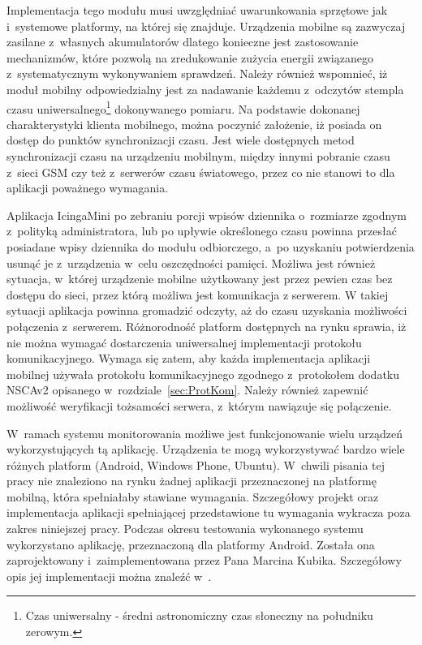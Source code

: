 Implementacja tego modułu musi uwzględniać uwarunkowania sprzętowe jak
i~systemowe platformy, na której się znajduje. Urządzenia mobilne są
zazwyczaj zasilane z~własnych akumulatorów dlatego konieczne jest
zastosowanie mechanizmów, które pozwolą na zredukowanie zużycia
energii związanego z~systematycznym wykonywaniem sprawdzeń. Należy
również wspomnieć, iż moduł mobilny odpowiedzialny jest za nadawanie
każdemu z~odczytów stempla czasu uniwersalnego\footnote{Czas
  uniwersalny - średni astronomiczny czas słoneczny na południku
  zerowym.} dokonywanego pomiaru. Na podstawie dokonanej
charakterystyki klienta mobilnego, można poczynić założenie, iż
posiada on dostęp do punktów synchronizacji czasu. Jest wiele
dostępnych metod synchronizacji czasu na urządzeniu mobilnym, między
innymi pobranie czasu z~sieci GSM czy też z~serwerów czasu światowego,
przez co nie stanowi to dla aplikacji poważnego wymagania.

Aplikacja IcingaMini po zebraniu porcji wpisów dziennika o~rozmiarze
zgodnym z~polityką administratora, lub po upływie określonego czasu
powinna przesłać posiadane wpisy dziennika do modułu odbiorczego, a~po
uzyskaniu potwierdzenia usunąć je z~urządzenia w~celu oszczędności
pamięci. Możliwa jest również sytuacja, w~której urządzenie mobilne
użytkowany jest przez pewien czas bez dostępu do sieci, przez którą
możliwa jest komunikacja z serwerem. W takiej sytuacji aplikacja
powinna gromadzić odczyty, aż do czasu uzyskania możliwości połączenia
z~serwerem. Różnorodność platform dostępnych na rynku sprawia, iż nie
można wymagać dostarczenia uniwersalnej implementacji protokołu
komunikacyjnego. Wymaga się zatem, aby każda implementacja aplikacji
mobilnej używała protokołu komunikacyjnego zgodnego z~protokołem
dodatku NSCAv2 opisanego w~rozdziale~\ref{sec:ProtKom}. Należy również
zapewnić możliwość weryfikacji tożsamości serwera, z~którym nawiązuje
się połączenie.

W~ramach systemu monitorowania możliwe jest funkcjonowanie wielu
urządzeń wykorzystujących tą aplikację. Urządzenia te mogą
wykorzystywać bardzo wiele różnych platform (Android, Windows Phone,
Ubuntu). W~chwili pisania tej pracy nie znaleziono na rynku żadnej
aplikacji przeznaczonej na platformę mobilną, która spełniałaby
stawiane wymagania. Szczegółowy projekt oraz implementacja aplikacji
spełniającej przedstawione tu wymagania wykracza poza zakres
niniejszej pracy. Podczas okresu testowania wykonanego systemu
wykorzystano aplikację, przeznaczoną dla platformy Android. Została
ona zaprojektowany i~zaimplementowana przez Pana Marcina
Kubika. Szczegółowy opis jej implementacji można znaleźć
w~\cite{book:pracaKubika}.

